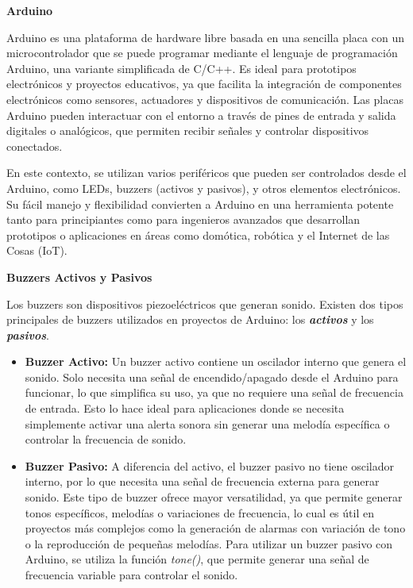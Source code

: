 \textbf{Arduino}

Arduino es una plataforma de hardware libre basada en una sencilla placa con un microcontrolador que se puede programar mediante el lenguaje de programación Arduino, una variante simplificada de C/C++. Es ideal para prototipos electrónicos y proyectos educativos, ya que facilita la integración de componentes electrónicos como sensores, actuadores y dispositivos de comunicación. Las placas Arduino pueden interactuar con el entorno a través de pines de entrada y salida digitales o analógicos, que permiten recibir señales y controlar dispositivos conectados.

En este contexto, se utilizan varios periféricos que pueden ser controlados desde el Arduino, como LEDs, buzzers (activos y pasivos), y otros elementos electrónicos. Su fácil manejo y flexibilidad convierten a Arduino en una herramienta potente tanto para principiantes como para ingenieros avanzados que desarrollan prototipos o aplicaciones en áreas como domótica, robótica y el Internet de las Cosas (IoT).

\textbf{Buzzers Activos y Pasivos}

Los buzzers son dispositivos piezoeléctricos que generan sonido. Existen dos tipos principales de buzzers utilizados en proyectos de Arduino: los \emph{\textbf{activos}} y los \emph{\textbf{pasivos}}.

\begin{itemize}
  \item \textbf{Buzzer Activo:} Un buzzer activo contiene un oscilador interno que genera el sonido. Solo necesita una señal de encendido/apagado desde el Arduino para funcionar, lo que simplifica su uso, ya que no requiere una señal de frecuencia de entrada. Esto lo hace ideal para aplicaciones donde se necesita simplemente activar una alerta sonora sin generar una melodía específica o controlar la frecuencia de sonido.
  \item \textbf{Buzzer Pasivo:} A diferencia del activo, el buzzer pasivo no tiene oscilador interno, por lo que necesita una señal de frecuencia externa para generar sonido. Este tipo de buzzer ofrece mayor versatilidad, ya que permite generar tonos específicos, melodías o variaciones de frecuencia, lo cual es útil en proyectos más complejos como la generación de alarmas con variación de tono o la reproducción de pequeñas melodías. Para utilizar un buzzer pasivo con Arduino, se utiliza la función \emph{tone()}, que permite generar una señal de frecuencia variable para controlar el sonido.
\end{itemize}

